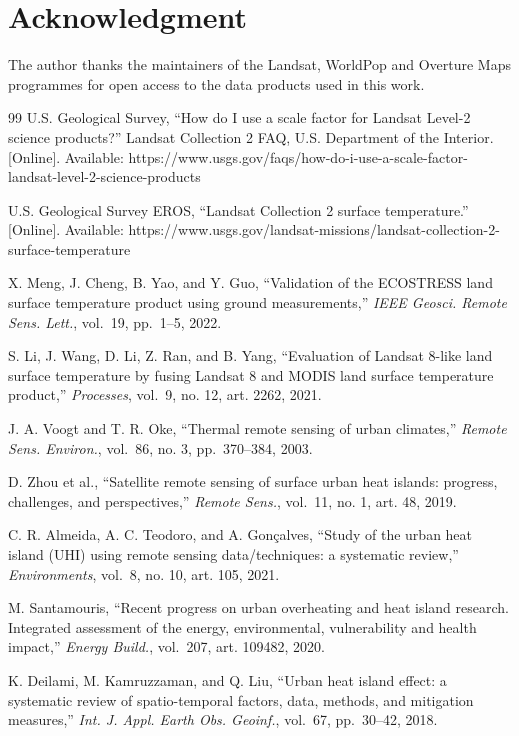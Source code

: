 \documentclass[conference]{IEEEtran}
\begin{document}
\section{Acknowledgment}\label{acknowledgment}

The author thanks the maintainers of the Landsat, WorldPop and Overture Maps programmes for open
access to the data products used in this work.

\begin{thebibliography}{99}
 U.S. Geological Survey, ``How do I use a scale factor for Landsat Level-2 science products?''
Landsat Collection 2 FAQ, U.S. Department of the Interior. {[}Online{]}. Available:
https://www.usgs.gov/faqs/how-do-i-use-a-scale-factor-landsat-level-2-science-products


 U.S. Geological Survey EROS, ``Landsat Collection 2 surface temperature.'' {[}Online{]}. Available:
https://www.usgs.gov/landsat-missions/landsat-collection-2-surface-temperature


 X. Meng, J. Cheng, B. Yao, and Y. Guo, ``Validation of the ECOSTRESS land surface temperature
product using ground measurements,'' \emph{IEEE Geosci. Remote Sens. Lett.}, vol.~19, pp.~1--5, 2022.


 S. Li, J. Wang, D. Li, Z. Ran, and B. Yang, ``Evaluation of Landsat 8-like land surface temperature
by fusing Landsat 8 and MODIS land surface temperature product,'' \emph{Processes}, vol.~9, no. 12,
art. 2262, 2021.


 J. A. Voogt and T. R. Oke, ``Thermal remote sensing of urban climates,'' \emph{Remote Sens. Environ.},
vol.~86, no. 3, pp.~370--384, 2003.


 D. Zhou et al., ``Satellite remote sensing of surface urban heat islands: progress, challenges, and
perspectives,'' \emph{Remote Sens.}, vol.~11, no. 1, art. 48, 2019.


 C. R. Almeida, A. C. Teodoro, and A. Gonçalves, ``Study of the urban heat island (UHI) using remote
sensing data/techniques: a systematic review,'' \emph{Environments}, vol.~8, no. 10, art. 105, 2021.


 M. Santamouris, ``Recent progress on urban overheating and heat island research. Integrated
assessment of the energy, environmental, vulnerability and health impact,'' \emph{Energy Build.}, vol.~207,
art. 109482, 2020.


 K. Deilami, M. Kamruzzaman, and Q. Liu, ``Urban heat island effect: a systematic review of
spatio-temporal factors, data, methods, and mitigation measures,'' \emph{Int. J. Appl. Earth Obs.
Geoinf.}, vol.~67, pp.~30--42, 2018.



\end{thebibliography}
\end{document}
